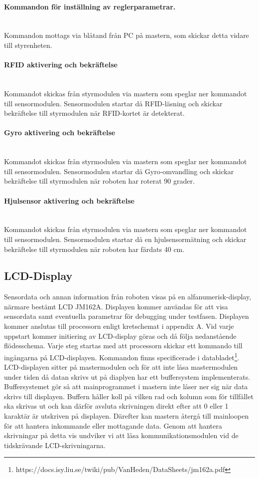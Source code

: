 \documentclass[a4paper,12pt,fleqn]{article}
\begin{document}
\paragraph{Kommandon för inställning av reglerparametrar.}
~\\
Kommandon mottags via blåtand från PC på mastern, som skickar detta vidare till styrenheten. 
\paragraph{RFID aktivering och bekräftelse}
~\\
Kommandot skickas från styrmodulen via mastern som speglar ner kommandot till sensormodulen. Sensormodulen startar då RFID-läsning och skickar bekräftelse till styrmodulen när RFID-kortet är detekterat.  

\paragraph{Gyro aktivering och bekräftelse}
~\\
Kommandot skickas från styrmodulen via mastern som speglar ner kommandot till sensormodulen. Sensormodulen startar då Gyro-omvandling och skickar bekräftelse till styrmodulen när roboten har roterat 90 grader. 

\paragraph{Hjulsensor aktivering och bekräftelse}
~\\
Kommandot skickas från styrmodulen via mastern som speglar ner kommandot till sensormodulen. Sensormodulen startar då en hjulsensormätning och skickar bekräftelse till styrmodulen när roboten har färdats 40 cm. 

\subsection{LCD-Display}
Sensordata och annan information från roboten visas på en alfanumerisk-display, närmare bestämt  LCD JM162A. Displayen kommer användas för att visa sensordata samt eventuella parametrar för debugging under testfasen.
Displayen kommer anslutas till processorn enligt kretschemat i appendix A. 
Vid varje uppstart kommer initiering av LCD-display göras och då följa nedanstående flödesschema. Varje steg startas med att processorn skickar ett kommando till ingångarna på LCD-displayen. Kommandon finns specificerade i databladet\footnote{https://docs.isy.liu.se/twiki/pub/VanHeden/DataSheets/jm162a.pdf}. LCD-displayen sitter på mastermodulen och för att inte låsa mastermodulen under tiden då datan  skrivs ut på diaplyen har ett buffersystem implementerats. Buffersystemet gör så att mainprogrammet i mastern inte låser ner sig när data skrivs till displayen. Buffern håller koll på vilken rad och kolumn som för tillfället ska skrivas ut och kan därför avsluta skrivningen direkt efter att 0 eller 1 karaktär är utskriven på displayen. Därefter kan mastern återgå till mainloopen för att hantera inkommande eller mottagande data. Genom att hantera skrivningar på detta vis undviker vi att låsa kommunikationsmodulen vid de tidskrävande LCD-skrivningarna.
\end{document}
